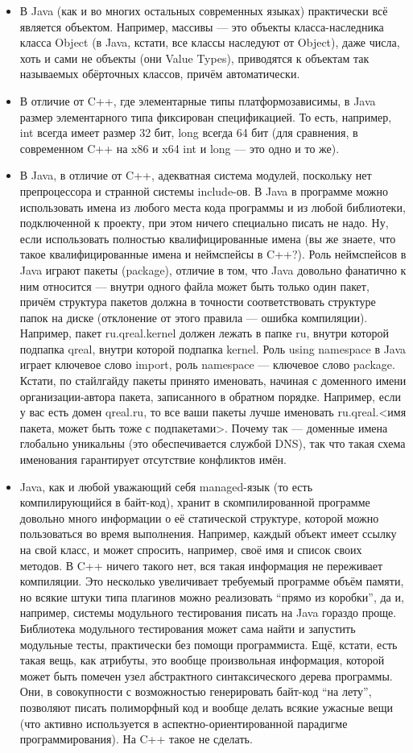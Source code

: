 \documentclass[a5paper]{article}
\begin{document}
\begin{itemize}
	\item В Java (как и во многих остальных современных языках) практически всё является объектом. Например, массивы --- это объекты класса-наследника класса Object (в Java, кстати, все классы наследуют от Object), даже числа, хоть и сами не объекты (они Value Types), приводятся к объектам так называемых обёрточных классов, причём автоматически.
	\item В отличие от C++, где элементарные типы платформозависимы, в Java размер элементарного типа фиксирован спецификацией. То есть, например, int всегда имеет размер 32 бит, long всегда 64 бит (для сравнения, в современном C++ на x86 и x64 int и long --- это одно и то же).
	\item В Java, в отличие от C++, адекватная система модулей, поскольку нет препроцессора и странной системы include-ов. В Java в программе можно использовать имена из любого места кода программы и из любой библиотеки, подключенной к проекту, при этом ничего специально писать не надо. Ну, если использовать полностью квалифицированные имена (вы же знаете, что такое квалифицированные имена и неймспейсы в C++?). Роль неймспейсов в Java играют пакеты (package), отличие в том, что Java довольно фанатично к ним относится --- внутри одного файла может быть только один пакет, причём структура пакетов должна в точности соответствовать структуре папок на диске (отклонение от этого правила --- ошибка компиляции). Например, пакет ru.qreal.kernel должен лежать в папке ru, внутри которой подпапка qreal, внутри которой подпапка kernel. Роль using namespace в Java играет ключевое слово import, роль namespace --- ключевое слово package. Кстати, по стайлгайду пакеты принято именовать, начиная с доменного имени организации-автора пакета, записанного в обратном порядке. Например, если у вас есть домен qreal.ru, то все ваши пакеты лучше именовать ru.qreal.<имя пакета, может быть тоже с подпакетами>. Почему так --- доменные имена глобально уникальны (это обеспечивается службой DNS), так что такая схема именования гарантирует отсутствие конфликтов имён.
	\item Java, как и любой уважающий себя managed-язык (то есть компилирующийся в байт-код), хранит в скомпилированной программе довольно много информации о её статической структуре, которой можно пользоваться во время выполнения. Например, каждый объект имеет ссылку на свой класс, и может спросить, например, своё имя и список своих методов. В C++ ничего такого нет, вся такая информация не переживает компиляции. Это несколько увеличивает требуемый программе объём памяти, но всякие штуки типа плагинов можно реализовать ``прямо из коробки'', да и, например, системы модульного тестирования писать на Java гораздо проще. Библиотека модульного тестирования может сама найти и запустить модульные тесты, практически без помощи программиста. Ещё, кстати, есть такая вещь, как атрибуты, это вообще произвольная информация, которой может быть помечен узел абстрактного синтаксического дерева программы. Они, в совокупности с возможностью генерировать байт-код ``на лету'', позволяют писать полиморфный код и вообще делать всякие ужасные вещи (что активно используется в аспектно-ориентированной парадигме программирования). На C++ такое не сделать.

\end{itemize}
\end{document}
